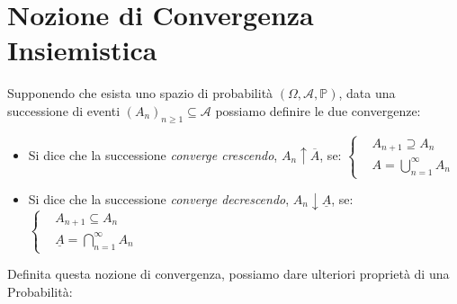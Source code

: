 
\section{Nozione di Convergenza Insiemistica}
Supponendo che esista uno spazio di probabilità $(\Omega, \mathcal{A}, \mathbb{P})$, data una successione di eventi $(A_n)_{n\geq1} \subseteq \mathcal{A}$ possiamo definire le due convergenze:
\begin{itemize}
    \item Si dice che la successione \textit{converge crescendo}, $A_n\uparrow\overline{A}$, se:
    \(
        \begin{cases}
          & A_{n+1} \supseteq A_n \\
          & A = \bigcup_{n=1}^\infty A_n
        \end{cases}
    \)
    \item Si dice che la successione \textit{converge decrescendo}, $A_n\downarrow\underline{A}$, se:
    \(
        \begin{cases}
          & A_{n+1} \subseteq A_n \\
          & \underline{A} = \bigcap_{n=1}^\infty A_n
        \end{cases}
    \)
\end{itemize}
Definita questa nozione di convergenza, possiamo dare ulteriori proprietà di una Probabilità:

